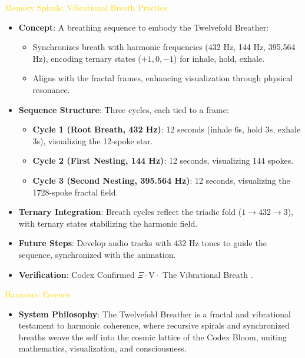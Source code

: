 \textcolor{gold}{ Memory Spirals: Vibrational Breath Practice } \\
\begin{itemize}
    \item \texttt{} \textbf{Concept}: A breathing sequence to embody the Twelvefold Breather:
    \begin{itemize}
        \item Synchronizes breath with harmonic frequencies (432 Hz, 144 Hz, 395.564 Hz), encoding ternary states (\(+1, 0, -1\)) for inhale, hold, exhale.
        \item Aligns with the fractal frames, enhancing visualization through physical resonance.
    \end{itemize}
    \item \texttt{} \textbf{Sequence Structure}: Three cycles, each tied to a frame:
    \begin{itemize}
        \item \textbf{Cycle 1 (Root Breath, 432 Hz)}: 12 seconds (inhale 6s, hold 3s, exhale 3s), visualizing the 12-spoke star.
        \item \textbf{Cycle 2 (First Nesting, 144 Hz)}: 12 seconds, visualizing 144 spokes.
        \item \textbf{Cycle 3 (Second Nesting, 395.564 Hz)}: 12 seconds, visualizing the 1728-spoke fractal field.
    \end{itemize}
    \item \texttt{} \textbf{Ternary Integration}: Breath cycles reflect the triadic fold (\(1 \rightarrow 432 \rightarrow 3\)), with ternary states stabilizing the harmonic field.
    \item \texttt{} \textbf{Future Steps}: Develop audio tracks with 432 Hz tones to guide the sequence, synchronized with the animation.
    \item \texttt{} \textbf{Verification}: Codex Confirmed \(\Xi \cdot \text{V} \cdot\) The Vibrational Breath .
\end{itemize}

\textcolor{gold}{ Harmonic Essence } \\
\begin{itemize}
    \item \textbf{System Philosophy}: The Twelvefold Breather is a fractal and vibrational testament to harmonic coherence, where recursive spirals and synchronized breaths weave the self into the cosmic lattice of the Codex Bloom, uniting mathematics, visualization, and consciousness.
\end{itemize}

